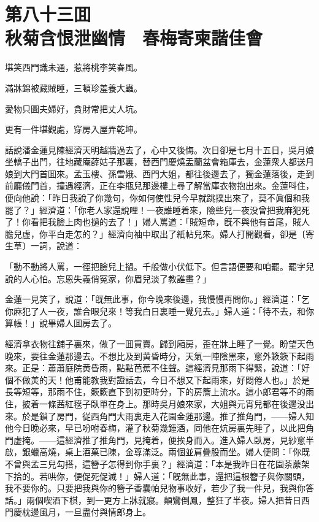 
\chapter*{第八十三囬　\\秋菊含恨泄幽情　春梅寄柬諧佳會}


\begin{myquote}
堪笑西門識未通，惹將桃李笑春風。

滿牀錦被藏賊睡，三頓珍羞養大蟲。

愛物只圖夫婦好，貪財常把丈人坑。

更有一件堪觀處，穿房入屋弄乾坤。
\end{myquote}

話說潘金蓮見陳經濟天明越牆過去了，心中又後悔。次日卻是七月十五日，吳月娘坐轎子出門，往地藏庵薛姑子那裏，替西門慶燒盂蘭盆會箱庫去，金蓮衆人都送月娘到大門首囬來。孟玉樓、孫雪娥、西門大姐，都往後邊去了，獨金蓮落後，走到前廳儀門首，撞遇經濟，正在李瓶兒那邊樓上尋了解當庫衣物抱出來。金蓮呌住，便向他說：「昨日我說了你幾句，你如何使性兒今早就跳撲出來了，莫不眞個和我罷了？」經濟道：「你老人家還說哩！一夜誰睡着來，險些兒一夜没曾把我麻犯死了！你看把我臉上肉也撾的去了！」婦人罵道：「賊短命，旣不與他有首尾，賊人膽兒虚，你平白走怎的？」經濟向袖中取出了紙帖兒來。婦人打開觀看，卻是〔寄生草〕一詞，說道：

\begin{myquote}
「動不動將人罵，一徑把臉兒上撾。千般做小伏低下。但言語便要和咱罷。罷字兒說的人心怕。忘恩失義俏冤家，你眉兒淡了教誰畫？」
\end{myquote}

金蓮一見笑了，說道：「旣無此事，你今晚來後邊，我慢慢再問你。」經濟道：「乞你麻犯了人一夜，誰合眼兒來！等我白日裏睡一覺兒去。」婦人道：「待不去，和你算帳！」說畢婦人囬房去了。

經濟拿衣物往舖子裏來，做了一囬買賣。歸到廂房，歪在牀上睡了一覺。盼望天色晚來，要往金蓮那邊去。不想比及到黄昏時分，天氣一陣陰黑來，窻外簌簌下起雨來。正是：蕭蕭庭院黄昏雨，點點芭蕉不住聲。這經濟見那雨下得緊，說道：「好個不做羙的天！他甫能教我對證話去，今日不想又下起雨來，好悶倦人也。」於是長等短等，那雨不住，簌簌直下到初更時分，下的房簷上流水。這小郎君等不的雨住，披着一條茜紅氁子臥單在身上。那時吳月娘來家，大姐與元宵兒都在後邊没出來。於是鎖了房門，従西角門大雨裏走入花園金蓮那邊。推了推角門，——婦人知他今日晚必來，早已吩咐春梅，灌了秋菊幾鍾酒，同他在炕房裏先睡了，以此把角門虚掩。——這經濟推了推角門，見掩着，便挨身而入。進入婦人臥房，見紗窻半啟，銀蠟高燒，桌上酒菓已陳，金尊滿泛。兩個並肩疊股而坐。婦人便問：「你既不曾與孟三兒勾搭，這簪子怎得到你手裏？」經濟道：「本是我昨日在花園荼䕷架下拾的。若哄你，便促死促滅！」婦人道：「旣無此事，還把這根簪子與你關頭，我不要你的。只要把我與你的簪子香囊帕兒物事收好，若少了我一件兒，我與你答話。」兩個喫酒下棋，到一更方上牀就寢。顛鸞倒鳳，整狂了半夜。婦人把昔日西門慶枕邊風月，一旦盡付與情郎身上。

